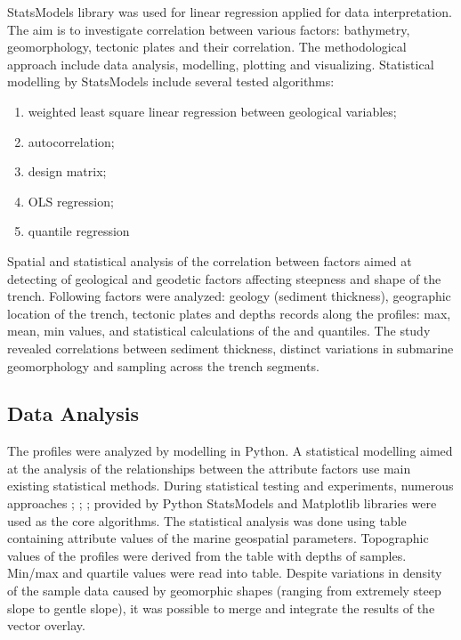 \documentclass[11pt,a4paper]{report}
\begin{document}
{StatsModels library was used for linear regression applied for data interpretation. The aim is to investigate correlation between various factors: bathymetry, geomorphology, tectonic plates and their correlation. The methodological approach include data analysis, modelling, plotting and visualizing. Statistical modelling by StatsModels include several tested algorithms: 

\begin{enumerate}
	\item weighted least square linear regression between geological variables;
	\item autocorrelation; 
	\item design matrix;
	\item \ac{OLS} regression;
	\item quantile regression
\end{enumerate}

Spatial and statistical analysis of the correlation between factors aimed at detecting of geological and geodetic factors affecting steepness and shape of the trench. Following factors were analyzed: geology (sediment thickness), geographic location of the trench, tectonic plates and depths records along the profiles: max, mean, min values, and statistical calculations of the  and  quantiles. The study revealed correlations between sediment thickness, distinct variations in submarine geomorphology and sampling across the trench segments. 

\subsection{Data Analysis}
The profiles were analyzed by modelling in Python. A statistical modelling aimed at the analysis of the relationships between the attribute factors use  main existing statistical methods. During statistical testing and experiments, numerous approaches \cite{BoxTiao1992}; \cite{Timm2007}; \cite{Oliphant2007}; \cite{Oliphant2015} provided by Python \ac{StatsModels} and Matplotlib libraries were used as the core algorithms. The statistical analysis was done using table containing attribute values of the marine geospatial parameters. Topographic values of the profiles were derived from the table with depths of samples. Min/max and quartile values were read into table. Despite variations in density of the sample data caused by geomorphic shapes (ranging from extremely steep slope to gentle slope), it was possible to merge and integrate the results of the vector overlay.

}
\end{document}
